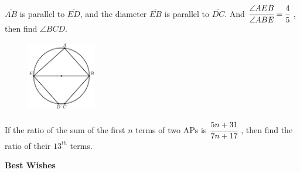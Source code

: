 \documentclass[11pt, a4paper]{exam}
\begin{document}
\begin{questions}
	\pointsdroppedatright
	\question
	$\overline{AB}$ is parallel to $\overline{ED}$, and the diameter $\overline{EB}$ is parallel to $\overline{DC}$. And $ \cfrac{\angle{AEB}}{\angle{ABE }} = \cfrac{4}{5}$ , then find $\angle{BCD}$.
	\begin{figure}[h!]
	\centering
	\includegraphics[width=0.27\textwidth]{figs/Q2.png}
	\end{figure}



	\question
	If the ratio of the sum of the first $n$ terms of two APs is $\cfrac{5n+31}{7n+17}$ , then find the ratio of their $13^{th}$ terms. 

\end{questions}
\vspace{0.1in}
{\large \bfseries Best Wishes}
\end{document}
